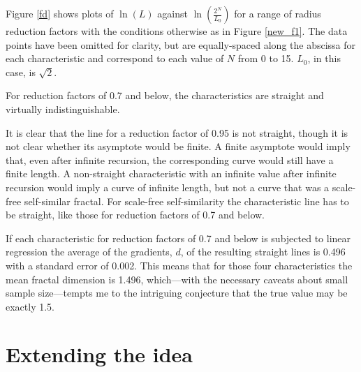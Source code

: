 \documentclass[12pt]{article}
\begin{document}
Figure \ref{fd} shows plots of $\ln (L)$ against $\ln
(\frac{2^N}{L_0})$ for a range of radius reduction factors with the
conditions otherwise as in Figure \ref{new_f1}.  The data points have
been omitted for clarity, but are equally-spaced along the abscissa
for each characteristic and correspond to each value of $N$ from 0 to
15.  $L_0$, in this case, is $\sqrt 2$.

For reduction factors of 0.7 and below, the characteristics are
straight and virtually indistinguishable.  

It is clear that the line for a reduction factor of 0.95 is not
straight, though it is not clear whether its asymptote would be
finite.  A finite asymptote would imply that, even after infinite
recursion, the corresponding curve would still have a finite length.
A non-straight characteristic with an infinite value after infinite
recursion would imply a curve of infinite length, but not a curve that
was a scale-free self-similar fractal.  For scale-free self-similarity
the characteristic line has to be straight, like those for reduction
factors of 0.7 and below.

If each characteristic for reduction factors of 0.7 and below is
subjected to linear regression the average of the gradients, $d$, of
the resulting straight lines is 0.496 with a standard error of 0.002.
This means that for those four characteristics the mean fractal
dimension is 1.496, which---with the necessary caveats about small
sample size---tempts me to the intriguing conjecture that the true
value may be exactly 1.5.

\section*{Extending the idea}
\end{document}
